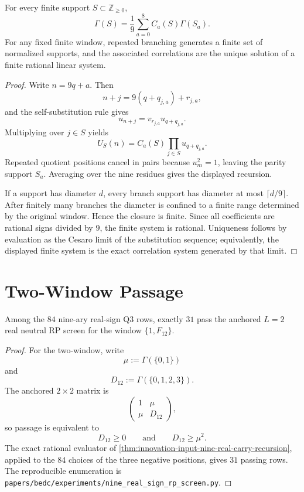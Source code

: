 \begin{theorem}
\label{thm:innovation-input-nine-real-carry-recursion}
For every finite support $S\subset\mathbb Z_{\ge0}$,
$$
\Gamma(S)=\frac19\sum_{a=0}^{8}C_a(S)\Gamma(S_a).
$$
For any fixed finite window, repeated branching generates a finite set of
normalized supports, and the associated correlations are the unique
solution of a finite rational linear system.
\end{theorem}

\begin{proof}
Write $n=9q+a$. Then
$$
n+j=9(q+q_{j,a})+r_{j,a},
$$
and the self-substitution rule gives
$$
u_{n+j}=v_{r_{j,a}}u_{q+q_{j,a}}.
$$
Multiplying over $j\in S$ yields
$$
U_S(n)
=
C_a(S)\prod_{j\in S}u_{q+q_{j,a}}.
$$
Repeated quotient positions cancel in pairs because $u_m^2=1$, leaving
the parity support $S_a$. Averaging over the nine residues gives the
displayed recursion.

If a support has diameter $d$, every branch support has diameter at most
$\lceil d/9\rceil$. After finitely many branches the diameter is confined
to a finite range determined by the original window. Hence the closure is
finite. Since all coefficients are rational signs divided by $9$, the
finite system is rational. Uniqueness follows by evaluation as the Cesaro
limit of the substitution sequence; equivalently, the displayed finite
system is the exact correlation system generated by that limit.
\end{proof}

\section{Two-Window Passage}
\label{sec:innovation-input-nine-two-window-passage}

\begin{proposition}[Anchored $L=2$ real screen]
\label{prop:innovation-input-nine-real-ltwo-screen}
Among the $84$ nine-ary real-sign Q3 rows, exactly $31$ pass the anchored
$L=2$ real neutral RP screen for the window $\{1,F_{12}\}$.
\end{proposition}

\begin{proof}
For the two-window, write
$$
\mu:=\Gamma(\{0,1\})
$$
and
$$
D_{12}:=\Gamma(\{0,1,2,3\}).
$$
The anchored $2\times2$ matrix is
$$
\begin{pmatrix}
1 & \mu\\
\mu & D_{12}
\end{pmatrix},
$$
so passage is equivalent to
$$
D_{12}\ge0
\qquad
\text{and}
\qquad
D_{12}\ge\mu^2.
$$
The exact rational evaluator of
\autoref{thm:innovation-input-nine-real-carry-recursion}, applied to the
$84$ choices of the three negative positions, gives $31$ passing rows. The
reproducible enumeration is
\texttt{papers/bedc/experiments/nine\_real\_sign\_rp\_screen.py}.
\end{proof}

